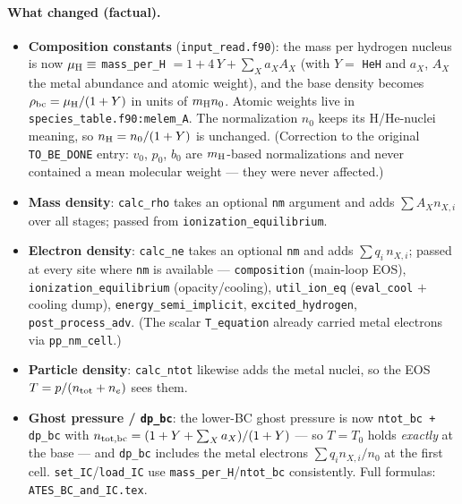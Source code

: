 \documentclass[english,a4paper]{kiseon_memo}
\begin{document}
\paragraph{What changed (factual).}
\begin{itemize}\itemsep1pt
\item \textbf{Composition constants} (\texttt{input\_read.f90}): the mass per
  hydrogen nucleus is now
  $\mu_{\rm H} \equiv$ \texttt{mass\_per\_H} $= 1 + 4\,Y + \sum_X a_X A_X$
  (with $Y=$ \texttt{HeH} and $a_X$, $A_X$ the metal abundance and atomic
  weight), and the base density becomes
  $\rho_{\rm bc} = \mu_{\rm H}/(1+Y)$ in units of $m_{\rm H} n_0$. Atomic
  weights live in \texttt{species\_table.f90:melem\_A}. The normalization $n_0$
  keeps its H/He-nuclei meaning, so $n_{\rm H} = n_0/(1+Y)$ is unchanged.
  (Correction to the original \texttt{TO\_BE\_DONE} entry: $v_0$, $p_0$,
  $b_0$ are $m_{\rm H}$-based normalizations and never contained a mean
  molecular weight --- they were never affected.)
\item \textbf{Mass density}: \texttt{calc\_rho} takes an optional \texttt{nm}
  argument and adds $\sum A_X n_{X,i}$ over all stages; passed from
  \texttt{ionization\_equilibrium}.
\item \textbf{Electron density}: \texttt{calc\_ne} takes an optional
  \texttt{nm} and adds $\sum q_i\,n_{X,i}$; passed at every site where
  \texttt{nm} is available --- \texttt{composition} (main-loop EOS),
  \texttt{ionization\_equilibrium} (opacity/cooling),
  \texttt{util\_ion\_eq} (\texttt{eval\_cool} $+$ cooling dump),
  \texttt{energy\_semi\_implicit}, \texttt{excited\_hydrogen},
  \texttt{post\_process\_adv}. (The scalar \texttt{T\_equation} already
  carried metal electrons via \texttt{pp\_nm\_cell}.)
\item \textbf{Particle density}: \texttt{calc\_ntot} likewise adds the metal
  nuclei, so the EOS $T = p/(n_{\rm tot}+n_e)$ sees them.
\item \textbf{Ghost pressure / \texttt{dp\_bc}}: the lower-BC ghost pressure is
  now \texttt{ntot\_bc + dp\_bc} with
  $n_{\rm tot,bc} = (1+Y+\sum_X a_X)/(1+Y)$ --- so $T=T_0$ holds
  \emph{exactly} at the base --- and \texttt{dp\_bc} includes the metal
  electrons $\sum q_i n_{X,i}/n_0$ at the first cell.
  \texttt{set\_IC}/\texttt{load\_IC} use
  \texttt{mass\_per\_H}/\texttt{ntot\_bc} consistently. Full formulas:
  \texttt{ATES\_BC\_and\_IC.tex}.
\end{itemize}
\end{document}
